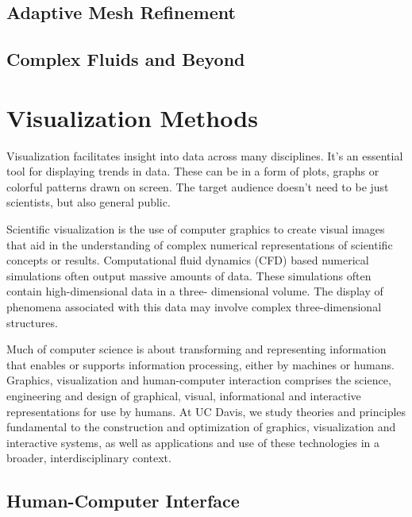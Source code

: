 \subsection{Adaptive Mesh Refinement}

\subsection{Complex Fluids and Beyond}


\section{Visualization Methods}

Visualization facilitates insight into data across many disciplines. It's an essential tool for displaying trends in data. These can be in a form of plots, graphs or colorful patterns drawn on screen. The target audience doesn't need to be just scientists, but also general public. 

Scientific visualization is the use of computer graphics to create visual images that aid in the understanding of complex numerical representations of scientific concepts or results. Computational fluid dynamics (CFD) based numerical simulations often output massive amounts of data. These simulations often contain high-dimensional data in a three- dimensional volume. The display of phenomena associated with this data may involve complex three-dimensional structures.
%

Much of computer science is about transforming and representing information that enables or supports information processing, either by machines or humans. Graphics, visualization and human-computer interaction comprises the science, engineering and design of graphical, visual, informational and interactive representations for use by humans. At UC Davis, we study theories and principles fundamental to the construction and optimization of graphics, visualization and interactive systems, as well as applications and use of these technologies in a broader, interdisciplinary context.
%

\subsection{Human-Computer Interface}

